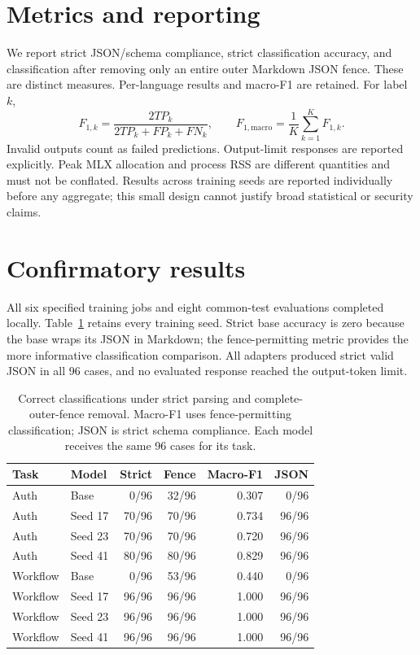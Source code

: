 \documentclass[11pt]{article}
\begin{document}
\section{Metrics and reporting}
We report strict JSON/schema compliance, strict classification accuracy, and classification after removing only an entire outer Markdown JSON fence. These are distinct measures. Per-language results and macro-F1 are retained. For label $k$,
\begin{equation}
 F_{1,k}=\frac{2TP_k}{2TP_k+FP_k+FN_k},\qquad
 F_{1,\mathrm{macro}}=\frac{1}{K}\sum_{k=1}^{K}F_{1,k}.
\end{equation}
Invalid outputs count as failed predictions. Output-limit responses are reported explicitly. Peak MLX allocation and process RSS are different quantities and must not be conflated. Results across training seeds are reported individually before any aggregate; this small design cannot justify broad statistical or security claims.

\section{Confirmatory results}
All six specified training jobs and eight common-test evaluations completed locally. Table~\ref{tab:results} retains every training seed. Strict base accuracy is zero because the base wraps its JSON in Markdown; the fence-permitting metric provides the more informative classification comparison. All adapters produced strict valid JSON in all 96 cases, and no evaluated response reached the output-token limit.

\begin{table}[ht]
\centering\small
\begin{tabular}{llrrrr}
\toprule
Task & Model & Strict & Fence & Macro-F1 & JSON\\
\midrule
Auth & Base & 0/96 & 32/96 & 0.307 & 0/96\\
Auth & Seed 17 & 70/96 & 70/96 & 0.734 & 96/96\\
Auth & Seed 23 & 70/96 & 70/96 & 0.720 & 96/96\\
Auth & Seed 41 & 80/96 & 80/96 & 0.829 & 96/96\\
\midrule
Workflow & Base & 0/96 & 53/96 & 0.440 & 0/96\\
Workflow & Seed 17 & 96/96 & 96/96 & 1.000 & 96/96\\
Workflow & Seed 23 & 96/96 & 96/96 & 1.000 & 96/96\\
Workflow & Seed 41 & 96/96 & 96/96 & 1.000 & 96/96\\
\bottomrule
\end{tabular}
\caption{Correct classifications under strict parsing and complete-outer-fence removal. Macro-F1 uses fence-permitting classification; JSON is strict schema compliance. Each model receives the same 96 cases for its task.}
\label{tab:results}
\end{table}
\end{document}
